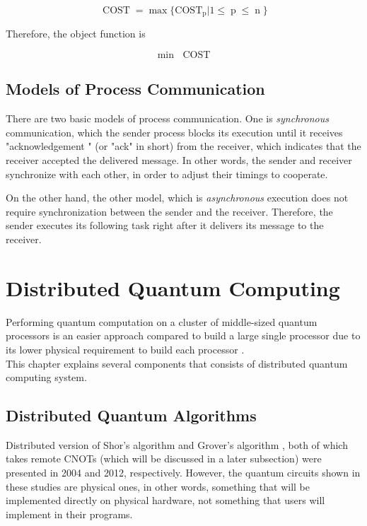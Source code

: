  \begin{equation}
 \operatorname{COST} =  \operatorname{max} \{\operatorname{COST_p} | 1 \leq \operatorname{p} \leq \operatorname{n}\}
  \end{equation}
 
 Therefore, the object function is 
 
 \begin{equation}
 \operatorname{min} \,\,\operatorname{COST}
 \end{equation}

\subsection{Models of Process Communication}

There are two basic models of process communication. One is \textit{synchronous} communication, which the sender process blocks its execution until it receives "acknowledgement " (or "ack" in short) from the receiver, which indicates that the receiver accepted the delivered message. In other words, the sender and receiver synchronize with each other, in order to adjust their timings to cooperate.
\par On the other hand, the other model, which is \textit{asynchronous} execution does not require synchronization between the sender and the receiver.  Therefore, the sender executes its following task right after it delivers its message to the receiver. 

\newpage

\section{Distributed Quantum Computing}
 
  Performing quantum computation on a cluster of middle-sized quantum processors is an easier approach compared to build a large single processor due to its lower physical requirement to build each processor \cite{distributedquantumcomputing}.  \\
This chapter explains several components that consists of distributed quantum computing system.

\subsection{Distributed Quantum Algorithms}

Distributed version of Shor's algorithm \cite{distributedshor} and Grover's algorithm \cite{distributedgrover}, both of which takes remote CNOTs (which will be discussed in a  later subsection) were presented in 2004 and 2012, respectively. 
However, the quantum circuits shown in these studies are physical ones, in other words, something that will be implemented directly on physical hardware, not something that users will implement in their programs. 

